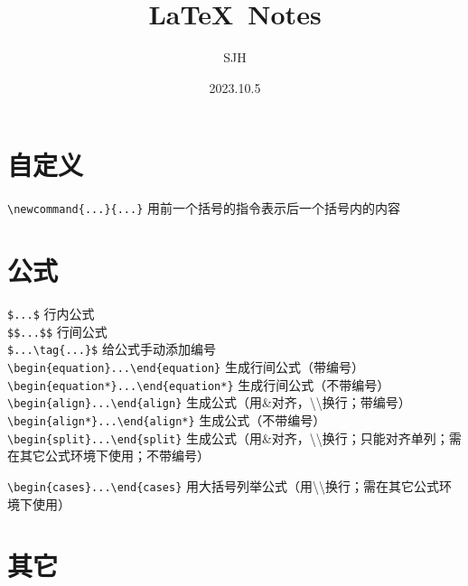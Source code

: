 \documentclass[a4paper,10pt]{ctexart}
\title{\LaTeX\ Notes}
\author{SJH}
\date{2023.10.5}
\newcommand{\s}{\textbackslash}
\begin{document}
\maketitle

\section{自定义}

\noindent
\verb|\newcommand{...}{...}| 用前一个括号的指令表示后一个括号内的内容\\

\section{公式}

\verb|$...$| 行内公式\\

\verb|$$...$$| 行间公式\\

\verb|$...\tag{...}$| 给公式手动添加编号\\

\verb|\begin{equation}...\end{equation}| 生成行间公式（带编号）\\

\verb|\begin{equation*}...\end{equation*}| 生成行间公式（不带编号）\\

\verb|\begin{align}...\end{align}| 生成公式（用\&对齐，\s\s 换行；带编号）\\

\verb|\begin{align*}...\end{align*}| 生成公式（不带编号）\\

\verb|\begin{split}...\end{split}| 生成公式（用\&对齐，\s\s 换行；只能对齐单列；需在其它公式环境下使用；不带编号）

\verb|\begin{cases}...\end{cases}| 用大括号列举公式（用\s\s 换行；需在其它公式环境下使用）


\section{其它}
\end{document}
